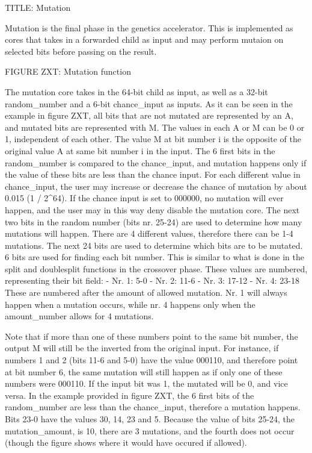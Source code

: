 TITLE: Mutation

Mutation is the final phase in the genetics accelerator. This is implemented as cores that takes in a forwarded child as input and may perform mutaion on selected bits before passing on the result. 

FIGURE ZXT: Mutation function

The mutation core takes in the 64-bit child as input, as well as a 32-bit random_number and a 6-bit chance_input as inputs. As it can be seen in the example in figure ZXT, all bits that are not mutated are represented by an A, and mutated bits are represented with M. The values in each A or M can be 0 or 1, independent of each other. The value M at bit number i is the opposite of the original value A at same bit number i in the input.
The 6 first bits in the random_number is compared to the chance_input, and mutation happens only if the value of these bits are less than the chance input. For each different value in chance_input, the user may increase or decrease the chance of mutation by about 0.015 (1 / 2^64). If the chance input is set to 000000, no mutation will ever happen, and the user may in this way deny disable the mutation core.
The next two bits in the random number (bits nr. 25-24) are used to determine how many mutations will happen. There are 4 different values, therefore there can be 1-4 mutations.
The next 24 bits are used to determine which bits are to be mutated. 6 bits are used for finding each bit number. This is similar to what is done in the split and doublesplit functions in the crossover phase. These values are numbered, representing their bit field:
- Nr. 1: 5-0
- Nr. 2: 11-6
- Nr. 3: 17-12
- Nr. 4: 23-18
These are numbered after the amount of allowed mutation. Nr. 1 will always happen when a mutation occurs, while nr. 4 happens only when the amount_number allows for 4 mutations.

Note that if more than one of these numbers point to the same bit number, the output M will still be the inverted from the original input. For instance, if numbers 1 and 2 (bits 11-6 and 5-0) have the value 000110, and therefore point at bit number 6, the same mutation will still happen as if only one of these numbers were 000110. If the input bit was 1, the mutated will be 0, and vice versa.
In the example provided in figure ZXT, the 6 first bits of the random_number are less than the chance_input, therefore a mutation happens. Bits 23-0 have the values 30, 14, 23 and 5. Because the value of bits 25-24, the mutation_amount, is 10, there are 3 mutations, and the fourth does not occur (though the figure shows where it would have occured if allowed).
